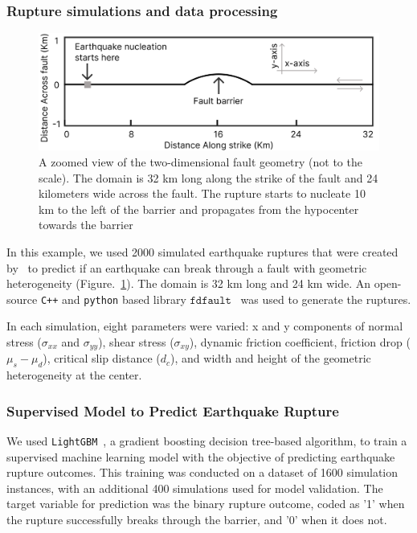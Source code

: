 \documentclass{article}
\begin{document}
\subsubsection{Rupture simulations and data processing}
\begin{figure}[ht]
    \begin{center}
        \includegraphics[scale=0.6]{figures/rupture_domain.png}
    \end{center}
    \caption{A zoomed view of the two-dimensional fault geometry (not to the scale). The domain is 32 km long along the strike of the fault and 24 kilometers wide across the fault. The rupture starts to nucleate 10 km to the left of the barrier and propagates from the hypocenter towards the barrier}
    \label{fig:rupture_domain}
\end{figure}

In this example, we used 2000 simulated earthquake ruptures that were created by~\cite{ahamed2021application} to predict if an earthquake can break through a fault with geometric heterogeneity (Figure.~\ref{fig:rupture_domain}). The domain is 32 km long and 24 km wide. An open-source \texttt{C++} and \texttt{python} based library $\texttt{fdfault}$~\cite{fdfaultEricGithub} was used to generate the ruptures.

In each simulation, eight parameters were varied: x and y components of normal stress ($\sigma_{xx}$ and $\sigma_{yy}$), shear stress ($\sigma_{xy}$), dynamic friction coefficient, friction drop ($\mu_{s} - \mu_{d}$), critical slip distance ($d_c$), and width and height of the geometric heterogeneity at the center.

\subsubsection{Supervised Model to Predict Earthquake Rupture}

We used \texttt{LightGBM}~\cite{ke2017lightgbm}, a gradient boosting decision tree-based algorithm, to train a supervised machine learning model with the objective of predicting earthquake rupture outcomes. This training was conducted on a dataset of 1600 simulation instances, with an additional 400 simulations used for model validation. The target variable for prediction was the binary rupture outcome, coded as '1' when the rupture successfully breaks through the barrier, and '0' when it does not.
\end{document}
